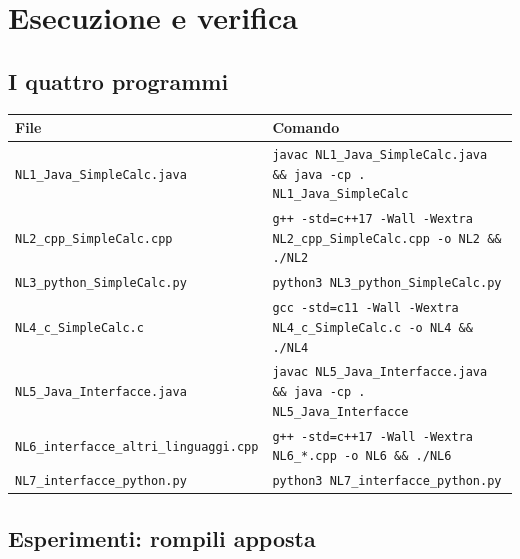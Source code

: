 \documentclass{report}
\newcommand{\code}[1]{\texttt{\small #1}}
\begin{document}
\chapter{Esecuzione e verifica}\label{ch:esecuzione}

\section{I quattro programmi}

\begin{center}
\renewcommand{\arraystretch}{1.3}
\footnotesize
\begin{tabular}{|>{\raggedright\arraybackslash}p{4.5cm}|>{\raggedright\arraybackslash}p{8.0cm}|}
\hline
\textbf{File} & \textbf{Comando} \\
\hline
\code{NL1\_Java\_SimpleCalc.java} & \code{javac NL1\_Java\_SimpleCalc.java \&\& java -cp . NL1\_Java\_SimpleCalc} \\
\hline
\code{NL2\_cpp\_SimpleCalc.cpp} & \code{g++ -std=c++17 -Wall -Wextra NL2\_cpp\_SimpleCalc.cpp -o NL2 \&\& ./NL2} \\
\hline
\code{NL3\_python\_SimpleCalc.py} & \code{python3 NL3\_python\_SimpleCalc.py} \\
\hline
\code{NL4\_c\_SimpleCalc.c} & \code{gcc -std=c11 -Wall -Wextra NL4\_c\_SimpleCalc.c -o NL4 \&\& ./NL4} \\
\hline
\code{NL5\_Java\_Interfacce.java} & \code{javac NL5\_Java\_Interfacce.java \&\& java -cp . NL5\_Java\_Interfacce} \\
\hline
\code{NL6\_interfacce\_}\allowbreak\code{altri\_linguaggi.cpp} & \code{g++ -std=c++17 -Wall -Wextra NL6\_*.cpp -o NL6 \&\& ./NL6} \\
\hline
\code{NL7\_interfacce\_python.py} & \code{python3 NL7\_interfacce\_python.py} \\
\hline
\end{tabular}
\end{center}

\section{Esperimenti: rompili apposta}
\end{document}
